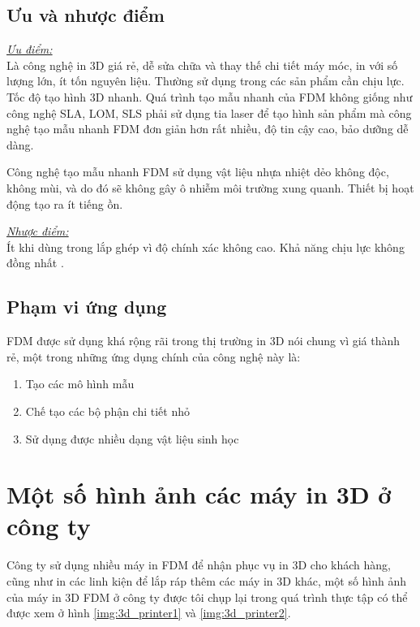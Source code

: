 \subsection{Ưu và nhược điểm}
\underline{\textit{Ưu điểm:}}\\
Là công nghệ in 3D giá rẻ, dễ sửa chữa và thay thế chi tiết máy móc, in với số lượng lớn, ít tốn nguyên liệu. Thường sử dụng trong các sản phẩm cần chịu lực. Tốc độ tạo hình 3D nhanh. Quá trình tạo mẫu nhanh của FDM không giống như công nghệ SLA, LOM, SLS phải sử dụng tia laser để tạo hình sản phẩm mà công nghệ tạo mẫu nhanh FDM đơn giản hơn rất nhiều, độ tin cậy cao, bảo dưỡng dễ dàng.

Công nghệ tạo mẫu nhanh FDM sử dụng vật liệu nhựa nhiệt dẻo không độc, không mùi, và do đó sẽ không gây ô nhiễm môi trường xung quanh. Thiết bị hoạt động tạo ra ít tiếng ồn.

\underline{\textit{Nhược điểm:}}\\
Ít khi dùng trong lắp ghép vì độ chính xác không cao. Khả năng chịu lực không đồng nhất .

\subsection{Phạm vi ứng dụng}
FDM được sử dụng khá rộng rãi trong thị trường in 3D nói chung vì giá thành rẻ, một trong những ứng dụng chính của công nghệ này là:
\begin{enumerate}
\item Tạo các mô hình mẫu
\item Chế tạo các bộ phận chi tiết nhỏ
\item Sử dụng được nhiều dạng vật liệu sinh học
\end{enumerate}

\section{Một số hình ảnh các máy in 3D ở công ty}
Công ty sử dụng nhiều máy in FDM để nhận phục vụ in 3D cho khách hàng, cũng như in các linh kiện để lắp ráp thêm các máy in 3D khác, một số hình ảnh của máy in 3D FDM ở công ty được tôi chụp lại trong quá trình thực tập có thể được xem ở hình \ref{img:3d_printer1} và \ref{img:3d_printer2}.

